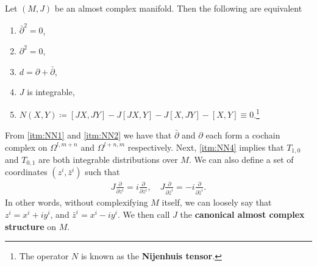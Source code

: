 \documentclass[11pt, final]{article}
\begin{document}
\begin{theorem}\label{thm:N-N}
	Let $(M,J)$ be an almost complex manifold. Then the following are equivalent
		\begin{enumerate}[label = (\roman*), itemsep=0pt, align = center]
			\item \label{itm:NN1} $\bar{\partial}^2 = 0$,
			\item \label{itm:NN2} $\partial^2 = 0$,
			\item \label{itm:NN3} $d = \partial + \bar{\partial}$,
			\item \label{itm:NN4} $J$ is integrable,
			\item \label{itm:NN5} $N(X,Y) \coloneqq [JX,JY] - J[JX,Y] - J[X,JY] - [X,Y] \equiv 0$.\footnote{The operator $N$ is known as the \textbf{Nijenhuis tensor}.}
		\end{enumerate}
\end{theorem}
\begin{remark}
	From \autoref{itm:NN1} and \autoref{itm:NN2} we have that $\bar{\partial}$ and $\partial$ each form a cochain complex on $\Omega^{l,m+n}$ and $\Omega^{l+n,m}$ respectively.
	Next, \autoref{itm:NN4} implies that $T_{1,0}$ and $T_{0,1}$ are both integrable distributions over $M$. We can also define a set of coordinates $(z^i,\bar{z}^i)$ such that
		\begin{align}\label{eq:JCanon}
			J \frac{\partial}{\partial z^i} = i \frac{\partial}{\partial z^i}, \quad J \frac{\partial}{\partial \bar{z}^i} = -i \frac{\partial}{\partial \bar{z}^i}.
		\end{align}
	In other words, without complexifying $M$ itself, we can loosely say that $z^i = x^i + i y^i$, and $\bar{z}^i = x^i - i y^i$. We then call $J$ the \textbf{canonical almost complex structure} on $M$.
\end{remark}
\end{document}
